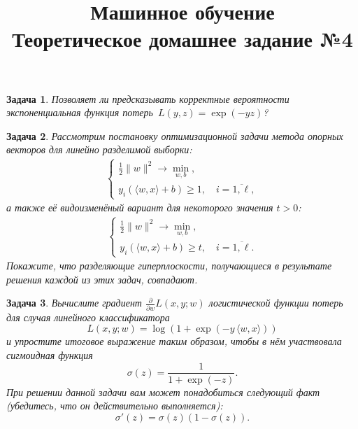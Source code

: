 \documentclass[12pt,fleqn]{article}
\newtheorem{esProblem}{Задача}
\begin{document}
\title{Машинное обучение\\Теоретическое домашнее задание №4}
\date{}
\author{}
\maketitle

\begin{esProblem}
    Позволяет ли предсказывать корректные вероятности экспоненциальная функция потерь~$L(y, z) = \exp(-yz)$?
\end{esProblem}

\begin{esProblem}
    Рассмотрим постановку оптимизационной задачи метода опорных векторов для линейно разделимой выборки:
    \begin{align*}
        \begin{cases}
            \frac{1}{2} \| w\|^2 \to \min_{w, b},\\
            y_i (\langle w, x\rangle + b) \ge 1, \quad i = \overline{1, \ell},
        \end{cases}
    \end{align*}
    а также её видоизменёный вариант для некоторого значения $t > 0$:
\begin{align*}
        \begin{cases}
            \frac{1}{2} \| w\|^2 \to \min_{w, b},\\
            y_i (\langle w, x\rangle + b) \ge t, \quad i = \overline{1, \ell}.
        \end{cases}
    \end{align*}
     Покажите, что разделяющие гиперплоскости, получающиеся в результате решения каждой из этих задач, совпадают.
        
\end{esProblem}

\begin{esProblem}
    Вычислите градиент $\frac{\partial}{\partial w}L(x, y; w)$ логистической функции потерь для случая линейного классификатора
    $$L(x, y; w) = \log (1 + \exp(-y \, \langle w, x\rangle))$$
    и упростите итоговое выражение таким образом, чтобы в нём участвовала сигмоидная функция 
    $$\sigma(z) = \frac{1}{1 + \exp(-z)}.$$
    При решении данной задачи вам может понадобиться следующий факт (убедитесь, что он действительно выполняется):
    $$\sigma'(z) = \sigma(z) (1- \sigma(z)).$$ 
\end{esProblem}
\end{document}
